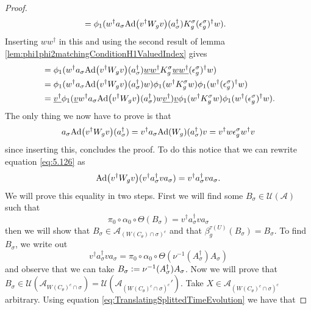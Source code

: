 \documentclass[12pt,a4paper,twoside]{article}
\newcommand{\defeq}{\vcentcolon=}
\let\originalleft\left
\let\originalright\right
\renewcommand{\left}{\mathopen{}\mathclose\bgroup\originalleft}
\renewcommand{\right}{\aftergroup\egroup\originalright}
\newcommand{\UU}{\mathcal U}
\renewcommand{\AA}{\mathcal A}
\newcommand{\Ad}[1]{\textrm{Ad}\left(#1\right)}
\theoremstyle{definition}
\numberwithin{equation}{section}
\begin{document}
\begin{proof}
\begin{align}
		&=\phi_1(w^\dagger a_\sigma \Ad{v^\dagger W_g v}(a_\sigma^\dagger)K_g^\sigma  (\epsilon_g^\sigma)^\dagger w).
	\end{align}
	Inserting $w w^\dagger$ in this and using the second result of lemma \ref{lem:phi1phi2matchingConditionH1ValuedIndex} gives
	\begin{align}
		&=\phi_1(w^\dagger a_\sigma \Ad{v^\dagger W_g v}(a_\sigma^\dagger)\underline{w w^\dagger}K_g^\sigma \underline{w w^\dagger}  (\epsilon_g^\sigma)^\dagger w)\\
		&=\phi_1(w^\dagger a_\sigma \Ad{v^\dagger W_g v}(a_\sigma^\dagger)w)\phi_1( w^\dagger K_g^\sigma w ) \phi_1( w^\dagger  (\epsilon_g^\sigma)^\dagger w)\\
		&=\underline{v^\dagger}\phi_1(\underline{v} w^\dagger a_\sigma \Ad{v^\dagger W_g v}(a_\sigma^\dagger)w \underline{v^\dagger})\underline{v}\phi_1( w^\dagger K_g^\sigma w ) \phi_1( w^\dagger  (\epsilon_g^\sigma)^\dagger w).
	\end{align}
	The only thing we now have to prove is that
	\begin{equation}\label{eq:5.126}
		a_\sigma \Ad{v^\dagger W_g v}(a_\sigma^\dagger)=v^\dagger a_\sigma \Ad{W_g}(a_\sigma^\dagger)v=v^\dagger w \epsilon_g^\sigma w^\dagger v
	\end{equation}
	since inserting this, concludes the proof. To do this notice that we can rewrite equation \eqref{eq:5.126} as
	\begin{equation}
		\Ad{v^\dagger W_g v}(v^\dagger a_\sigma^\dagger v a_\sigma)=v^\dagger a_\sigma^\dagger v a_\sigma.
	\end{equation}
	We will prove this equality in two steps. First we will find some $B_\sigma\in\UU(\AA)$ such that
	\begin{equation}
		\pi_0\circ\alpha_0\circ\Theta(B_\sigma)=v^\dagger a_\sigma^\dagger v a_\sigma
	\end{equation}
	then we will show that $B_\sigma\in\AA_{(W(C_\theta)\cap\sigma)^c}$ and that $\beta_g^{\tau(U)}(B_\sigma)=B_\sigma$. To find $B_\sigma$, we write out
	\begin{equation}
		v^\dagger a_\sigma^\dagger v a_\sigma=\pi_0\circ\alpha_0\circ\Theta(\nu^{-1}(A_\sigma^\dagger)A_\sigma)
	\end{equation}
	and observe that we can take $B_\sigma \defeq \nu^{-1}(A_\sigma^\dagger)A_\sigma$. Now we will prove that $B_\sigma\in\UU(\AA_{W(C_\theta)^c\cap\sigma})=\UU(\AA_{(W(C_\theta)^c\cap\sigma)^c}')$. Take $X\in\AA_{(W(C_\theta)^c\cap\sigma)^c}$ arbitrary. Using equation \eqref{eq:TranslatingSplittedTimeEvolution} we have that

\end{proof}
\end{document}
